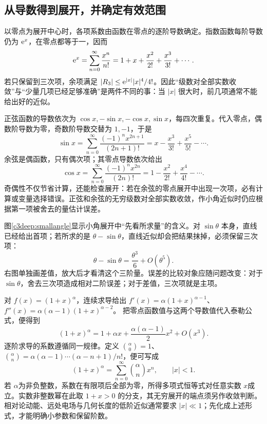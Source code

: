 \subsection{从导数得到展开，并确定有效范围}
以零点为展开中心时，各项系数由函数在零点的逐阶导数确定。指数函数每阶导数仍为 $\mathrm e^x$，在零点都等于一，因而
\[
 \mathrm e^x=\sum_{n=0}^{\infty}\frac{x^n}{n!}
 =1+x+\frac{x^2}{2!}+\frac{x^3}{3!}+\cdots.
\]
若只保留到三次项，余项满足 $|R_3|\le\mathrm e^{|x|}|x|^4/4!$。因此“级数对全部实数收敛”与“少量几项已经足够准确”是两件不同的事：当 $|x|$ 很大时，前几项通常不能给出好的近似。

正弦函数的导数依次为 $\cos x,-\sin x,-\cos x,\sin x$，每四次重复。代入零点，偶数阶导数为零，奇数阶导数交替为 $1,-1$，于是
\[
 \sin x=\sum_{n=0}^{\infty}\frac{(-1)^nx^{2n+1}}{(2n+1)!}
 =x-\frac{x^3}{3!}+\frac{x^5}{5!}-\cdots.
\]
余弦是偶函数，只有偶次项；其零点导数依次给出
\[
 \cos x=\sum_{n=0}^{\infty}\frac{(-1)^nx^{2n}}{(2n)!}
 =1-\frac{x^2}{2!}+\frac{x^4}{4!}-\cdots.
\]
奇偶性不仅节省计算，还能检查展开：若在余弦的零点展开中出现一次项，必有计算或变量选择错误。正弦和余弦的无穷级数对全部实数收敛，作小角近似时仍应根据第一项被舍去的量估计误差。


图\ref{c3deep:smallangle}显示小角展开中“先看所求量”的含义。对 $\sin\theta$ 本身，直线已经给出首项；若所求的是 $\theta-\sin\theta$，直线近似却会把结果抹掉，必须保留三次项：
\[
 \theta-\sin\theta=\frac{\theta^3}{6}+O(\theta^5).
\]
右图单独画差值，放大后才看清这个三阶量。误差的比较对象应随问题改变：对于 $\sin\theta$，舍去三次项造成相对二阶误差；对于差值，三次项就是主项。


对 $f(x)=(1+x)^\alpha$，连续求导给出
$f'(x)=\alpha(1+x)^{\alpha-1}$、
$f''(x)=\alpha(\alpha-1)(1+x)^{\alpha-2}$。
把零点函数值与这两个导数值代入泰勒公式，便得到
\[
 (1+x)^\alpha
 =1+\alpha x+\frac{\alpha(\alpha-1)}2x^2+O(x^3).
\]
逐阶求导的系数遵循同一规律。定义 $\binom\alpha0=1$、$\binom\alpha n=\alpha(\alpha-1)\cdots(\alpha-n+1)/n!$，便可写成
\[
 (1+x)^\alpha=\sum_{n=0}^{\infty}\binom\alpha n x^n,\qquad |x|<1.
\]
若 $\alpha$为非负整数，系数在有限项后全部为零，所得多项式恒等式对任意实数 $x$成立。实数非整数幂在此取 $1+x>0$ 的分支，其无穷展开的端点须另作收敛判断。相对论动能、远处电场与几何长度的低阶近似通常要求 $|x|\ll1$；先化成上述形式，才能明确小参数和保留阶数。

